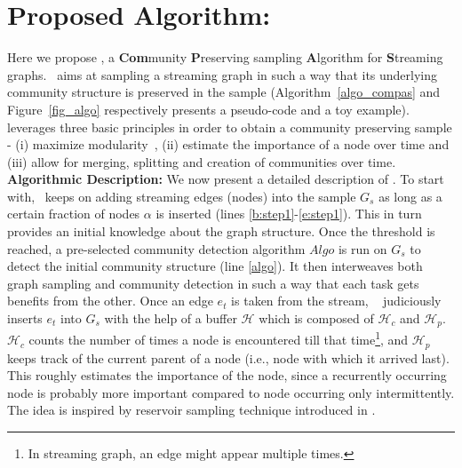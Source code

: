 
\section{Proposed Algorithm: \compas}
\label{algorithm}

Here we propose \compas, a {\bf Com}munity {\bf P}reserving sampling {\bf A}lgorithm for {\bf S}treaming graphs. \compas~aims at sampling a streaming graph in such a way that its underlying community structure is preserved in the sample (Algorithm~\ref{algo_compas} and Figure~\ref{fig_algo} respectively presents a pseudo-code and a toy example). 
\compas~ leverages three basic principles in order to obtain a community preserving sample - (i) maximize  modularity~\cite{newman2004analysis}, (ii) estimate the importance of a node over time and (iii) allow for merging, splitting and creation of communities over time. \\
{\bf Algorithmic Description:} We now present a detailed description of \compas.
To start with, \compas~keeps on adding streaming edges (nodes) into the sample $G_s$ as long as a certain fraction of nodes $\alpha$ is inserted (lines \ref{b:step1}-\ref{e:step1}). This in turn provides an initial knowledge about the graph structure. 
Once the threshold is reached, a pre-selected community detection algorithm $Algo$ is run on $G_s$ to detect the initial community structure (line \ref{algo}). It then interweaves both graph sampling and community detection in such a way that each task gets benefits from the other. Once an edge $e_t$ is taken from the stream, \compas~ judiciously inserts $e_t$ into $G_s$ with the help of a buffer $\mathcal{H}$ which is composed of $\mathcal{H}_c$ and $\mathcal{H}_p$. $\mathcal{H}_c$ counts 
the number of times a node is encountered till that time\footnote{In streaming graph, an edge might appear multiple times.}, and $\mathcal{H}_p$ keeps track of the current parent of a node (i.e., node with which it arrived last). %
This roughly estimates the importance of the node, since a recurrently occurring node is probably more important compared to node occurring only intermittently. The idea is inspired by reservoir sampling technique introduced in \cite{ahmed2014network}.

